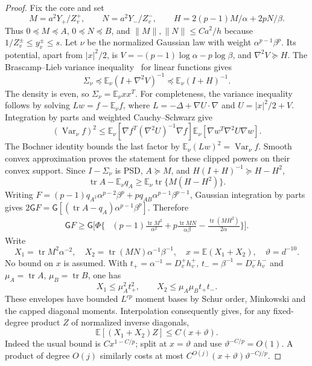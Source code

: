 \documentclass[10pt]{article}
\numberwithin{equation}{section}
\newcommand{\1}{\mathbf1}
\begin{document}
\begin{proof}
Fix the core and set
\[
 M=a^2Y_+/Z_v^+,\qquad N=a^2Y_-/Z_v^-,\qquad
 H=2(p-1)M/\alpha+2pN/\beta.
\]
Thus $0\preceq M\preceq A$, $0\preceq N\preceq B$, and
$\|M\|,\|N\|\le Ca^2/h$ because $1/Z_v^\pm\le y_v^\pm\le s$.
Let $\nu$ be the normalized Gaussian law with weight
$\alpha^{p-1}\beta^p$. Its potential, apart from $|x|^2/2$, is
$V=-(p-1)\log\alpha-p\log\beta$, and $\nabla^2V\succeq H$.
The Brascamp--Lieb variance inequality~\cite{BL} for linear functions gives
\[
 \Sigma_\nu\preceq\mathbb E_\nu(I+\nabla^2V)^{-1}
 \preceq\mathbb E_\nu(I+H)^{-1}.
\]
The density is even, so $\Sigma_\nu=\mathbb E_\nu xx^T$.
For completeness, the variance inequality follows by solving
$Lw=f-\mathbb E_\nu f$, where $L=-\Delta+\nabla U\cdot\nabla$ and
$U=|x|^2/2+V$. Integration by parts and weighted Cauchy--Schwarz give
\[
 (\operatorname{Var}_\nu f)^2
 \le \mathbb E_\nu[\nabla f^T(\nabla^2U)^{-1}\nabla f]
       \mathbb E_\nu[\nabla w^T\nabla^2U\nabla w].
\]
The Bochner identity bounds the last factor by
$\mathbb E_\nu(Lw)^2=\operatorname{Var}_\nu f$.
Smooth convex approximation proves the statement for these clipped
powers on their convex support. Since $I-\Sigma_\nu$
is PSD, $A\succeq M$, and $H(I+H)^{-1}\succeq H-H^2$,
\[
 \operatorname{tr}A-\mathbb E_\nu q_A
 \ge\mathbb E_\nu\operatorname{tr}\{M(H-H^2)\}.
\]
Writing $F=(p-1)q_{A^2}\alpha^{p-2}\beta^p
 +pq_{AB}\alpha^{p-1}\beta^{p-1}$, Gaussian integration by parts gives
$2\mathsf GF=\mathsf G[(\operatorname{tr}A-q_A)\alpha^{p-1}\beta^p]$.
Therefore
\begin{align*}
 \mathsf GF\ge\mathsf G\biggl[\Phi\biggl\{
 &(p-1)\frac{\operatorname{tr}M^2}{\alpha^2}
  +p\frac{\operatorname{tr}MN}{\alpha\beta}
  -\frac{\operatorname{tr}(MH^2)}{2\alpha}\biggr\}\biggr].       \tag{B2}
\end{align*}
Write
\[
 X_1=\operatorname{tr}M^2\alpha^{-2},\quad
 X_2=\operatorname{tr}(MN)\alpha^{-1}\beta^{-1},\quad
 x=\mathbb E(X_1+X_2),\quad \vartheta=d^{-10}.
\]
No bound on $x$ is assumed. With $t_+=\alpha^{-1}=D_v^+h_v^+$,
$t_-=\beta^{-1}=D_v^-h_v^-$ and $\mu_A=\operatorname{tr}A$,
$\mu_B=\operatorname{tr}B$, one has
\[
 X_1\le\mu_A^2t_+^2,\qquad X_2\le\mu_A\mu_Bt_+t_-.
\]
These envelopes have bounded $L^{cp}$ moment bases by Schur order,
Minkowski and the capped diagonal moments. Interpolation consequently
gives, for any fixed-degree product $Z$ of normalized inverse diagonals,
\[
 \mathbb E[(X_1+X_2)Z]\le C(x+\vartheta).
 \tag{B3}
\]
Indeed the usual bound is $Cx^{1-C/p}$; split at $x=\vartheta$ and
use $\vartheta^{-C/p}=O(1)$. A product of degree $O(j)$ similarly
costs at most $C^{O(j)}(x+\vartheta)\vartheta^{-Cj/p}$.


\end{proof}
\end{document}
